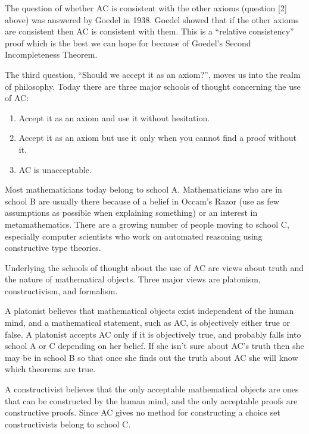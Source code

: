 The question of whether AC is consistent with the other axioms (question [2]
above) was answered by Goedel in 1938.  Goedel showed that if the other axioms
are consistent then AC is consistent with them.  This is a ``relative
consistency'' proof which is the best we can hope for because of Goedel's
Second Incompleteness Theorem.

The third question, ``Should we accept it as an axiom?'', moves us into the
realm of philosophy.  Today there are three major schools of thought
concerning the use of AC:
\begin{enumerate}
\item Accept it as an axiom and use it without hesitation.
\item Accept it as an axiom but use it only when you cannot find a proof
    without it.
\item AC is unacceptable.
\end{enumerate}
Most mathematicians today belong to school A.  Mathematicians who are in
school B are usually there because of a belief in Occam's Razor (use as few
assumptions as possible when explaining something) or an interest in
metamathematics.  There are a growing number of people moving to school C,
especially computer scientists who work on automated reasoning using
constructive type theories.

Underlying the schools of thought about the use of AC are views about truth
and the nature of mathematical objects.  Three major views are platonism,
constructivism, and formalism.

\medskip
{}
\smallskip

A platonist believes that mathematical objects exist independent of the human
mind, and a mathematical statement, such as AC, is objectively either true or
false.  A platonist accepts AC only if it is objectively true, and probably
falls into school A or C depending on her belief.  If she isn't sure about
AC's truth then she may be in school B so that once she finds out the truth
about AC she will know which theorems are true.

\medskip
{}
\smallskip

A constructivist believes that the only acceptable mathematical objects are
ones that can be constructed by the human mind, and the only acceptable proofs
are constructive proofs.  Since AC gives no method for constructing a choice
set constructivists belong to school C.

\medskip
{}
\smallskip

